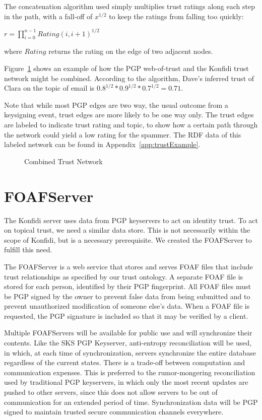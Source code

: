 \documentclass[letterpaper]{www2006-submission}
\begin{document}
The concatenation algorithm used simply multiplies trust ratings along each step in the path, with a fall-off of $x^{1/2}$ to keep the ratings from falling too quickly:

\begin{center}
$r = \prod_{i=0}^{n-1} Rating(i, i + 1)^{1/2}$
\end{center}

where $Rating$ returns the rating on the edge of two adjacent nodes.

Figure~\ref{fig:full} shows an example of how the PGP web-of-trust and the Konfidi trust network might be combined.  According to the algorithm, Dave's inferred trust of Clara on the topic of email is $0.8^{1/2} * 0.9^{1/2} * 0.7^{1/2} = 0.71$.

Note that while most PGP edges are two way, the usual outcome from a keysigning event, trust edges are more likely to be one way only.  The trust edges are labeled to indicate trust rating and topic, to show how a certain path through the network could yield a low rating for the spammer.  The RDF data of this labeled network can be found in Appendix~\ref{app:trustExample}.

\begin{figure}[thp]
\centering
{}
\caption{Combined Trust Network}
\label{fig:full}
\end{figure}

\section{FOAFServer}
\label{foafserver}
The Konfidi server uses data from PGP keyservers to act on identity trust.  To act on topical trust, we need a similar data store.  This is not necessarily within the scope of Konfidi, but is a necessary prerequisite.  We created the FOAFServer to fulfill this need.

The FOAFServer is a web service that stores and serves FOAF files that include trust relationships as specified by our trust ontology.  A separate FOAF file is stored for each person, identified by their PGP fingerprint.  All FOAF files must be PGP signed by the owner to prevent false data from being submitted and to prevent unauthorized modification of someone else's data.  When a FOAF file is requested, the PGP signature is included so that it may be verified by a client.

Multiple FOAFServers will be available for public use and will synchronize their contents.  Like the SKS PGP Keyserver\citep{sks}, anti-entropy reconciliation will be used, in which, at each time of synchronization, servers synchronize the entire database regardless of the current states.  There is a trade-off between computation and communication expenses.  This is preferred to the rumor-mongering reconciliation  used by traditional PGP keyservers, in which only the most recent updates are pushed to other servers, since this does not allow servers to be out of communication for an extended period of time.  Synchronization data will be PGP signed to maintain trusted secure communication channels everywhere.
\end{document}
